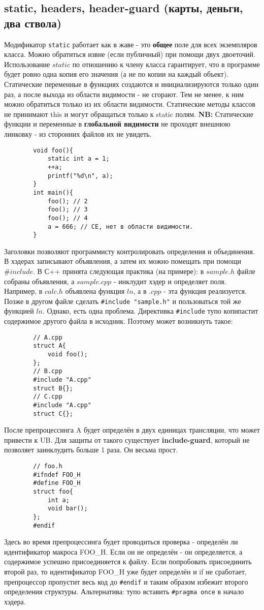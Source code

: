 \documentclass[15pt, a4paper]{article}
\newcommand{\nl}{\newline}
\begin{document}
    \subsection{static, headers, header-guard (карты, деньги, два ствола)}
    Модификатор \texttt{static} работает как в жаве - это \textbf{общее} поле для всех экземпляров класса. Можно обратиться извне (если публичный) при помощи двух двоеточий.
    Использование $static$ по отношению к члену класса гарантирует, что в программе будет ровно одна копия его значения (а не по копии на каждый объект).
    Статические переменные в функциях создаются и инициализируются только один раз, а после выхода из области видимости - не сгорают. Тем не менее, к ним можно обратиться только из их области видимости.
    Статические методы классов не принимают this и могут обращаться только к static полям. \nl
    \textbf{NB:} Статические функции и переменные в \textbf{глобальной видимости} не проходят внешнюю линковку - из сторонних файлов их не увидеть.
    \begin{verbatim}
        void foo(){
            static int a = 1;
            ++a;
            printf("%d\n", a);
        }
        int main(){
            foo(); // 2
            foo(); // 3
            foo(); // 4
            a = 666; // CE, нет в области видимости.
        }
    \end{verbatim}
    Заголовки позволяют программисту контролировать определения и объединения. В хэдерах записывают объявления, а затем их можно помещать при помощи $\# include$.
    В С++ принята следующая практика (на примере): в $sample.h$ файле собраны объявления, а $sample.cpp$ - инклудит хэдер и определяет поля. Например, в $calc.h$ объявлена
    функция $ln$, а в $.cpp$ - эта функция реализуется. Позже в другом файле сделать \texttt{\#include "sample.h"} и пользоваться той же функцией $ln$. \nl 
    Однако, есть одна проблема. Директивка \texttt{\#include} тупо копипастит содержимое другого файла в исходник. Поэтому может возникнуть такое:
    \begin{verbatim}
        // A.cpp
        struct A{
            void foo();
        };
        // B.cpp
        #include "A.cpp"
        struct B{};
        // C.cpp
        #include "A.cpp"
        struct C{};
    \end{verbatim}
    После препроцессинга A будет определён в двух единицах трансляции, что может привести к UB. Для защиты от такого существует \textbf{include-guard}, который не позволяет заинклудить больше 1 раза. Он весьма прост.
    \begin{verbatim}
        // foo.h
        #ifndef FOO_H
        #define FOO_H
        struct foo{
            int a;
            void bar();
        };
        #endif
    \end{verbatim}
    Здесь во время препроцессинга будет проводиться проверка - определён ли идентификатор макроса FOO\_H. Если он не определён - он определяется, а содержимое
    успешно присоединяется к файлу. Если попробовать присоединить второй раз, то идентификатор FOO\_H уже будет определён и if не сработает, препроцессор пропустит весь код до \texttt{\#endif}
    и таким образом избежит второго определения структуры. \nl
    Альтернатива: тупо вставить \texttt{\#pragma once} в начало хэдера.
\end{document}
